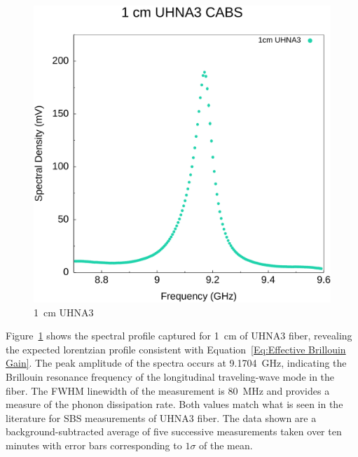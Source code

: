 \begin{figure}[t!]
  \centering
  \includegraphics[width=\textwidth]{figs/4-CoBS/1cmUHNA3.pdf}
  \caption{\SI{1}{\centi\meter} UHNA3}
  \label{fig:1cmUHNA3}
\end{figure}

Figure~\ref{fig:1cmUHNA3} shows the spectral profile captured for \SI{1}{\centi\meter} of \ac{UHNA3} fiber, revealing the expected lorentzian profile consistent with Equation~\ref{Eq:Effective Brillouin Gain}. The peak amplitude of the spectra occurs at \SI{9.1704}{\giga\hertz}, indicating the Brillouin resonance frequency of the longitudinal traveling-wave mode in the fiber. The \ac{FWHM} linewidth of the measurement is \SI{80}{\mega\hertz} and provides a measure of the phonon dissipation rate. Both values match what is seen in the literature for \ac{SBS} measurements of \ac{UHNA3} fiber.\cite{behunin2015long} The data shown are a background-subtracted average of five successive measurements taken over ten minutes with error bars corresponding to \(1\sigma\) of the mean.

